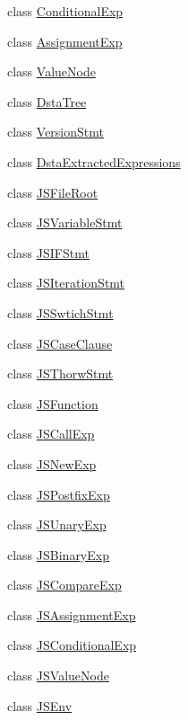 \begin{DoxyCompactItemize}
class \hyperlink{classmocha_1_1_conditional_exp}{ConditionalExp}
\item 
class \hyperlink{classmocha_1_1_assignment_exp}{AssignmentExp}
\item 
class \hyperlink{classmocha_1_1_value_node}{ValueNode}
\item 
class \hyperlink{classmocha_1_1_dsta_tree}{DstaTree}
\item 
class \hyperlink{classmocha_1_1_version_stmt}{VersionStmt}
\item 
class \hyperlink{classmocha_1_1_dsta_extracted_expressions}{DstaExtractedExpressions}
\item 
class \hyperlink{classmocha_1_1_j_s_file_root}{JSFileRoot}
\item 
class \hyperlink{classmocha_1_1_j_s_variable_stmt}{JSVariableStmt}
\item 
class \hyperlink{classmocha_1_1_j_s_i_f_stmt}{JSIFStmt}
\item 
class \hyperlink{classmocha_1_1_j_s_iteration_stmt}{JSIterationStmt}
\item 
class \hyperlink{classmocha_1_1_j_s_swtich_stmt}{JSSwtichStmt}
\item 
class \hyperlink{classmocha_1_1_j_s_case_clause}{JSCaseClause}
\item 
class \hyperlink{classmocha_1_1_j_s_thorw_stmt}{JSThorwStmt}
\item 
class \hyperlink{classmocha_1_1_j_s_function}{JSFunction}
\item 
class \hyperlink{classmocha_1_1_j_s_call_exp}{JSCallExp}
\item 
class \hyperlink{classmocha_1_1_j_s_new_exp}{JSNewExp}
\item 
class \hyperlink{classmocha_1_1_j_s_postfix_exp}{JSPostfixExp}
\item 
class \hyperlink{classmocha_1_1_j_s_unary_exp}{JSUnaryExp}
\item 
class \hyperlink{classmocha_1_1_j_s_binary_exp}{JSBinaryExp}
\item 
class \hyperlink{classmocha_1_1_j_s_compare_exp}{JSCompareExp}
\item 
class \hyperlink{classmocha_1_1_j_s_assignment_exp}{JSAssignmentExp}
\item 
class \hyperlink{classmocha_1_1_j_s_conditional_exp}{JSConditionalExp}
\item 
class \hyperlink{classmocha_1_1_j_s_value_node}{JSValueNode}
\item 
class \hyperlink{classmocha_1_1_j_s_env}{JSEnv}
\item 

\end{DoxyCompactItemize}
